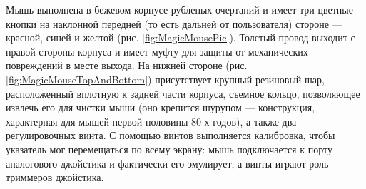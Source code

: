 \documentclass[11pt, a4paper]{article}
\begin{document}
Мышь выполнена в бежевом корпусе рубленых очертаний и имеет три цветные кнопки на наклонной передней (то есть дальней от пользователя) стороне --- красной, синей и желтой (рис. \ref{fig:MagicMousePic}). Толстый провод  выходит с правой стороны корпуса и имеет муфту для защиты от механических повреждений в месте выхода. На нижней стороне (рис. \ref{fig:MagicMouseTopAndBottom}) присутствует крупный резиновый шар, расположенный вплотную к задней части корпуса, съемное кольцо, позволяющее извлечь его для чистки мыши (оно крепится шурупом --- конструкция, характерная для мышей первой половины 80-х годов), а также два регулировочных винта. С помощью винтов выполняется калибровка, чтобы указатель мог перемещаться по всему экрану: мышь подключается к порту аналогового джойстика и фактически его эмулирует, а винты играют роль триммеров джойстика.
\end{document}

